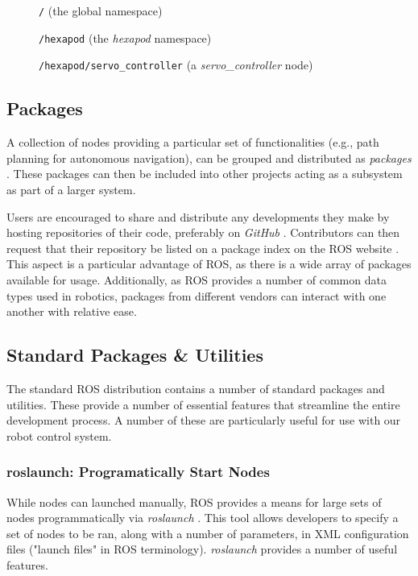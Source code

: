 \begin{figure}[h]
    \centering

    \texttt{/} (the global namespace)

    \texttt{/hexapod} (the \emph{hexapod} namespace)

    \texttt{/hexapod/servo\_controller} (a \emph{servo\_controller} node)
\end{figure}

\subsection{Packages}
A collection of nodes providing a particular set of functionalities (e.g., path planning for autonomous navigation), can be grouped and distributed as \emph{packages} \cite{ros_paper}. These packages can then be included into other projects acting as a subsystem as part of a larger system.

Users are encouraged to share and distribute any developments they make by hosting repositories of their code, preferably on \emph{GitHub} \cite{ros_wiki_getinvolved}. Contributors can then request that their repository be listed on a package index on the ROS website \cite{ros_wiki_getinvolved}. This aspect is a particular advantage of ROS, as there is a wide array of packages available for usage. Additionally, as ROS provides a number of common data types used in robotics, packages from different vendors can interact with one another with relative ease.

\subsection{Standard Packages \& Utilities}
The standard ROS distribution contains a number of standard packages and utilities. These provide a number of essential features that streamline the entire development process. A number of these are particularly useful for use with our robot control system.

\subsubsection{roslaunch: Programatically Start Nodes}
While nodes can launched manually, ROS provides a means for large sets of nodes programmatically via \emph{roslaunch} \cite{ros_paper, ros_wiki_roslaunch}. This tool allows developers to specify a set of nodes to be ran, along with a number of parameters, in XML configuration files ("launch files" in ROS terminology). \emph{roslaunch} provides a number of useful features.

